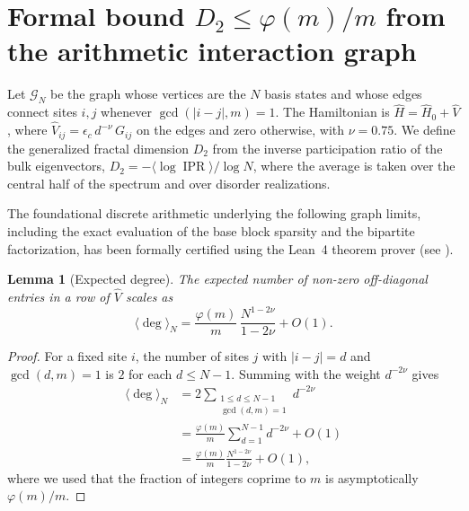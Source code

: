 \documentclass[11pt,a4paper]{article}
\newtheorem{lemma}[theorem]{Lemma}
\DeclareMathOperator{\IPR}{IPR}
\begin{document}
\section{Formal bound \texorpdfstring{$D_2 \le \varphi(m)/m$}{D2 <= phi(m)/m} from the arithmetic interaction graph}
\label{app:bound}

Let $\mathcal{G}_N$ be the graph whose vertices are the $N$ basis states and whose edges connect sites $i,j$ whenever $\gcd(|i-j|,m)=1$. The Hamiltonian is $\hat H = \hat H_0 + \hat V$, where $\hat V_{ij} = \epsilon_c \, d^{-\nu} \, G_{ij}$ on the edges and zero otherwise, with $\nu=0.75$. We define the generalized fractal dimension $D_2$ from the inverse participation ratio of the bulk eigenvectors, $D_2 = -\langle\log \IPR\rangle / \log N$, where the average is taken over the central half of the spectrum and over disorder realizations.

The foundational discrete arithmetic underlying the following graph limits, including the exact evaluation of the base block sparsity and the bipartite factorization, has been formally certified using the Lean~4 theorem prover (see ).

\begin{lemma}[Expected degree]\label{lem:degree}
The expected number of non-zero off-diagonal entries in a row of $\hat V$ scales as
\begin{equation}
\langle \deg \rangle_N = \frac{\varphi(m)}{m} \, \frac{N^{1-2\nu}}{1-2\nu} + O(1).
\end{equation}
\end{lemma}
\begin{proof}
For a fixed site $i$, the number of sites $j$ with $|i-j|=d$ and $\gcd(d,m)=1$ is $2$ for each $d\le N-1$. Summing with the weight $d^{-2\nu}$ gives
\begin{align*}
\langle \deg \rangle_N &= 2\sum_{\substack{1\le d\le N-1 \\ \gcd(d,m)=1}} d^{-2\nu} \\
&= \frac{\varphi(m)}{m} \sum_{d=1}^{N-1} d^{-2\nu} + O(1) \\
&= \frac{\varphi(m)}{m} \frac{N^{1-2\nu}}{1-2\nu} + O(1),
\end{align*}
where we used that the fraction of integers coprime to $m$ is asymptotically $\varphi(m)/m$.
\end{proof}
\end{document}
